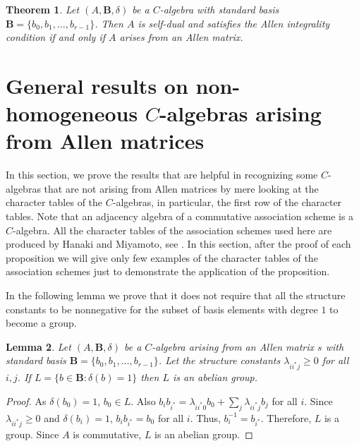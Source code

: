 \documentclass[12pt]{amsart}
\newtheorem{thm}{Theorem}
\newtheorem{lemma}[thm]{Lemma}
\begin{document}
\begin{thm}\label{IntegralCAlgebrasAndFourierMatrices}
Let $(A,{{\mathbf B}}, \delta)$ be a $C$-algebra with standard basis ${{\mathbf B}}=\{b_0,b_1, \hdots, b_{r-1}\}$. Then $A$ is self-dual and satisfies the Allen integrality condition if and only if $A$ arises from an Allen matrix.
\end{thm}

\smallskip

\section{General results on non-homogeneous $C$-algebras arising from Allen matrices}

\medskip

In this section, we prove the results that are helpful in recognizing some $C$-algebras that are not arising from Allen matrices by mere looking at the character tables of the $C$-algebras, in particular, the first row of the character tables. Note that an adjacency algebra of a commutative association scheme is a $C$-algebra. All the character tables of the association schemes used here are produced by Hanaki and Miyamoto, see \cite{HM}. In this section, after the proof of each proposition we will give only few examples of the character tables of the association schemes just to demonstrate the application of the proposition.

\smallskip

In the following lemma we prove that it does not require that all the structure constants to be nonnegative for the subset of basis elements with degree $1$ to become a group.

\begin{lemma}\label{ElementaryGroupLemma}
Let $(A,{{\mathbf B}}, \delta)$ be a $C$-algebra arising from an  Allen matrix $s$ with standard basis ${{\mathbf B}}=\{b_0,b_1,\hdots, b_{r-1}\}$. Let the structure constants $\lambda_{ii^*j}\geq 0$ for all $i,j$. If $L=\{b\in {{\mathbf B}}: \delta(b)=1\}$ then $L$ is an abelian group.
\end{lemma}

\begin{proof}
As $\delta(b_0)=1$, $b_0\in L$. Also $b_ib_{i^*}=\lambda_{ii^*0}b_0+\sum_j\lambda_{ii^*j}b_j$ for all $i$. Since $\lambda_{ii^*j}\geq 0$ and  $\delta(b_i)=1$,  $b_ib_{i^*}=b_0$ for all $i$.  Thus, $b^{-1}_i=b_{i^*}$.  Therefore, $L$ is a group. Since $A$ is commutative, $L$ is an  abelian group.
\end{proof}
\end{document}
